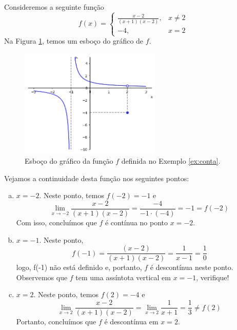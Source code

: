 \cleardoublepage\documentclass[../main.tex]{subfiles}
\begin{document}
\vspace{0.2cm}
\begin{ex}\label{ex:conta}
  Consideremos a seguinte função
  \begin{equation*}
    f(x) = \left\{
      \begin{array}{ll}
        \frac{x-2}{(x+1)(x-2)}, & x\neq 2\\
        -4, & x=2
      \end{array}
\right.
\end{equation*}
Na Figura \ref{fig:ex_conta}, temos um esboço do gráfico de $f$.

\begin{figure}[!htb]
  \centering
  \includegraphics[width=0.6\textwidth]{fig_lim/fig_ex_conta}
  \caption{Esboço do gráfico da função $f$ definida no Exemplo \ref{ex:conta}.}
  \label{fig:ex_conta}
\end{figure}

Vejamos a continuidade desta função nos seguintes pontos:
\begin{enumerate}[a)]
\item $x=-2$. Neste ponto, temos $f(-2) = -1$ e
  \begin{equation*}
    \lim_{x\to -2} \frac{x-2}{(x+1)(x-2)} = \frac{-4}{-1\cdot(-4)} = -1 = f(-2)
  \end{equation*}
  Com isso, concluímos que $f$ é contínua no ponto $x=-2$.
\item $x=-1$. Neste ponto,
  \begin{equation*}
    f(-1) = \frac{(x-2)}{(x+1)(x-2)} = \frac{1}{x-1} = \frac{1}{0}
  \end{equation*}
  logo, f(-1) não está definido e, portanto, $f$ é descontínua neste ponto. Observemos que $f$ tem uma assíntota vertical em $x=-1$, verifique!
\item $x=2$. Neste ponto, temos $f(2)=-4$ e
  \begin{equation*}
    \lim_{x\to 2} \frac{x-2}{(x+1)(x-2)} = \lim_{x\to 2} \frac{1}{x+1} = \frac{1}{3} \neq f(2)
  \end{equation*}
  Portanto, concluímos que $f$ é descontínua em $x=2$.
\end{enumerate}
\end{ex}
\end{document}
